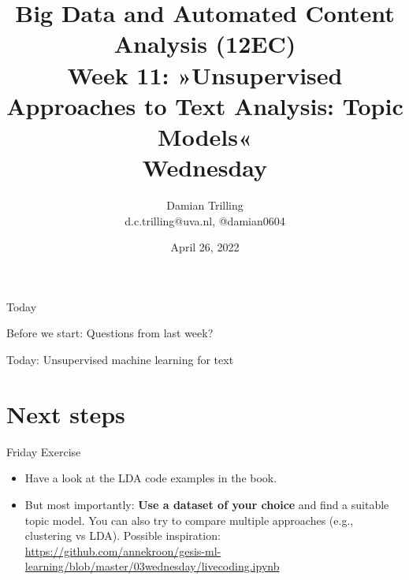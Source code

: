 

\graphicspath{{../../resources/img/}}




\title[Big Data and Automated Content Analysis]{\textbf{Big Data and Automated Content Analysis (12EC)} 
\\Week 11: »Unsupervised Approaches to Text Analysis: Topic Models«
\\Wednesday}
\author[Damian Trilling]{Damian Trilling\\ \footnotesize{d.c.trilling@uva.nl, @damian0604 \\}}
\date{April 26, 2022}


\begin{frame}{}
	\titlepage
\end{frame}

\begin{frame}{Today}
	\tableofcontents
\end{frame}
\begin{frame}[standout]
Before we start: Questions from last week?
\end{frame}


\begin{frame}[standout]
Today: Unsupervised machine learning for text
\end{frame}









\section{Next steps}

\begin{frame}[plain]

  \begin{block}{Friday Exercise}
    \footnotesize
  \begin{itemize}
  \item Have a look at the LDA code examples in the book.
  \item But most importantly: \textbf{Use a dataset of your choice} and find a suitable topic model. You can also try to compare multiple approaches (e.g., clustering vs LDA). Possible inspiration: \url{https://github.com/annekroon/gesis-ml-learning/blob/master/03wednesday/livecoding.ipynb}
    \end{itemize}
\end{block}

\end{frame}


\begin{frame}
	\printbibliography
\end{frame}




